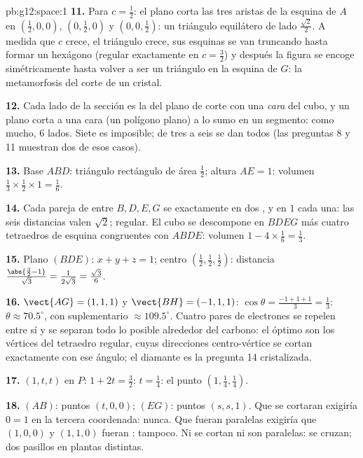 \begin{solution}{pb:g12:space:1}
\textbf{11.} Para $c = \frac12$: el plano corta las tres aristas de la
esquina de $A$ en $\left(\frac12,0,0\right)$,
$\left(0,\frac12,0\right)$ y $\left(0,0,\frac12\right)$: un triángulo
equilátero de lado $\frac{\sqrt2}{2}$. A medida que $c$ crece, el triángulo
crece, sus esquinas se van truncando hasta formar un hexágono (regular
exactamente en $c = \frac32$) y después la figura se encoge simétricamente
hasta volver a ser un triángulo en la esquina de $G$: la metamorfosis del
corte de un cristal.

\textbf{12.} Cada lado de la sección es la  del plano de corte
con una \emph{cara} del cubo, y un plano corta a una cara (un polígono
plano) a lo sumo en un segmento: como mucho, $6$ lados. Siete es
imposible; de tres a seis se dan todos (las preguntas 8 y 11 muestran dos
de esos casos).

\textbf{13.} Base $ABD$: triángulo rectángulo de área $\frac12$; altura
$AE = 1$: volumen $\frac13 \times \frac12 \times 1 = \frac16$.

\textbf{14.} Cada pareja de entre $B, D, E, G$ se  exactamente en
dos , y en $1$ cada una: las seis distancias valen $\sqrt2$;
regular. El cubo se descompone en $BDEG$ más cuatro tetraedros de esquina
congruentes con $ABDE$: volumen $1 - 4 \times \frac16 = \frac13$.

\textbf{15.} Plano $(BDE)$: $x + y + z = 1$; centro
$\left(\frac12,\frac12,\frac12\right)$: distancia
$\frac{\abs{\frac32 - 1}}{\sqrt3} = \frac{1}{2\sqrt3} = \frac{\sqrt3}{6}$.

\textbf{16.} $\vect{AG} = (1,1,1)$ y $\vect{BH} = (-1,1,1)$:
$\cos\theta = \frac{-1 + 1 + 1}{3} = \frac13$: $\theta \approx 70.5^\circ$,
con suplementario $\approx 109.5^\circ$. Cuatro pares de electrones se
repelen entre sí y se separan todo lo posible alrededor del carbono: el
óptimo son los vértices del tetraedro regular, cuyas direcciones
centro-vértice se cortan exactamente con ese ángulo; el diamante es la
pregunta 14 cristalizada.

\textbf{17.} $(1, t, t)$ en $P$: $1 + 2t = \frac32$: $t = \frac14$: el
punto $\left(1, \frac14, \frac14\right)$.

\textbf{18.} $(AB)$: puntos $(t, 0, 0)$; $(EG)$: puntos $(s, s, 1)$. Que se
cortaran exigiría $0 = 1$ en la tercera coordenada: nunca. Que fueran
paralelas exigiría que $(1,0,0)$ y $(1,1,0)$ fueran : tampoco. Ni
se cortan ni son paralelas: se cruzan; dos pasillos en plantas distintas.


\end{solution}
